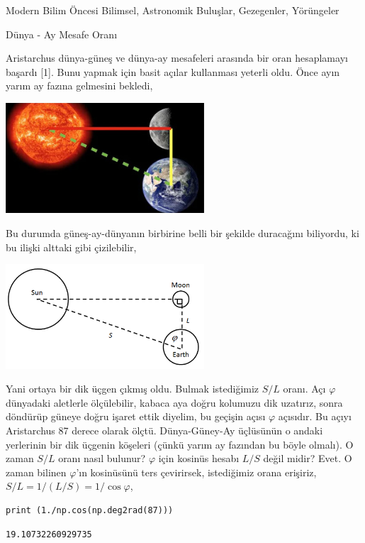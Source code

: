 \documentclass[12pt,fleqn]{article}\usepackage{../../common}
\begin{document}
Modern Bilim Öncesi Bilimsel, Astronomik Buluşlar, Gezegenler, Yörüngeler

Dünya - Ay Mesafe Oranı

Aristarchus dünya-güneş ve dünya-ay mesafeleri arasında bir oran hesaplamayı
başardı [1]. Bunu yapmak için basit açılar kullanması yeterli oldu. Önce ayın
yarım ay fazına gelmesini bekledi,

\includegraphics[width=20em]{moonshad.jpg}

Bu durumda güneş-ay-dünyanın birbirine belli bir şekilde duracağını biliyordu, ki
bu ilişki alttaki gibi çizilebilir,

\includegraphics[width=20em]{sunmoon.png}

Yani ortaya bir dik üçgen çıkmış oldu. Bulmak istediğimiz $S/L$ oranı. Açı
$\varphi$ dünyadaki aletlerle ölçülebilir, kabaca aya doğru kolumuzu dik
uzatırız, sonra döndürüp güneye doğru işaret ettik diyelim, bu geçişin açısı
$\varphi$ açısıdır. Bu açıyı Aristarchus 87 derece olarak ölçtü. Dünya-Güney-Ay
üçlüsünün o andaki yerlerinin bir dik üçgenin köşeleri (çünkü yarım ay fazından
bu böyle olmalı). O zaman $S/L$ oranı nasıl bulunur?  $\varphi$ için kosinüs
hesabı $L/S$ değil midir?  Evet. O zaman bilinen $\varphi$'ın kosinüsünü ters
çevirirsek, istediğimiz orana erişiriz, $S/L = 1/(L/S) = 1 / \cos\varphi$,

\begin{verbatim}
print (1./np.cos(np.deg2rad(87)))
\end{verbatim}

\begin{verbatim}
19.10732260929735
\end{verbatim}
\end{document}
